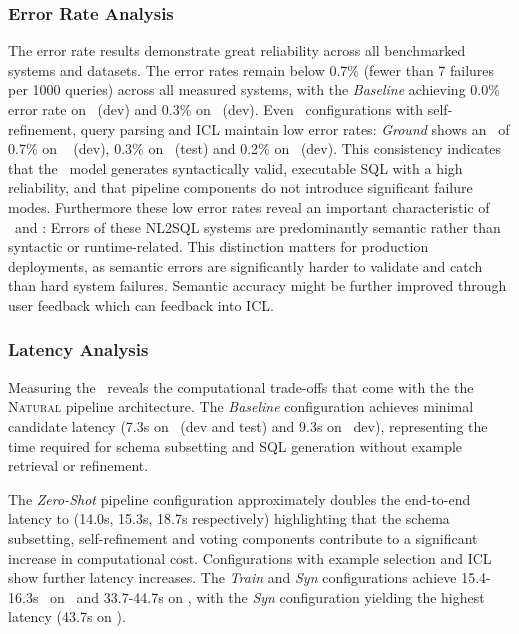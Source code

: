 \subsubsection{Error Rate Analysis}

The error rate results demonstrate great reliability across all benchmarked
systems and datasets. The error rates remain below 0.7\% (fewer than 7 failures
per 1000 queries) across all measured systems, with the \textit{Baseline}
achieving 0.0\% error rate on \Spider~(dev) and 0.3\% on \Bird~(dev). Even
\Natural~configurations with self-refinement, query parsing and ICL maintain
low error rates: \textit{Ground} shows an \ER~of 0.7\% on \Spider~ (dev), 0.3\%
on \Spider~(test) and 0.2\% on \Bird~(dev). This consistency indicates that the
\OmniSQL~model generates syntactically valid, executable SQL with a high
reliability, and that pipeline components do not introduce significant failure
modes. Furthermore these low error rates reveal an important characteristic of
\OmniSQL~and \Natural: Errors of these NL2SQL systems are predominantly
semantic rather than syntactic or runtime-related. This distinction matters for
production deployments, as semantic errors are significantly harder to validate
and catch than hard system failures. Semantic accuracy might be further
improved through user feedback which can feedback into ICL. 

\subsubsection{Latency Analysis}

Measuring the \CL~reveals the computational trade-offs that come with the
the \textsc{Natural} pipeline architecture. The \textit{Baseline} configuration
achieves minimal candidate latency (7.3s on \Spider~(dev and test) and 9.3s on
\Bird~dev), representing the time required for schema
subsetting and SQL generation without example retrieval or refinement.

The \textit{Zero-Shot} pipeline configuration approximately doubles the
end-to-end latency to (14.0s, 15.3s, 18.7s respectively) highlighting that the
schema subsetting, self-refinement and voting components contribute to a
significant increase in computational cost. Configurations with example
selection and ICL show further latency increases. The \textit{Train} and
\textit{Syn} configurations achieve 15.4-16.3s \CL~on \Spider~and 33.7-44.7s
on \Bird, with the \textit{Syn} configuration yielding the highest latency
(43.7s on \Bird).

